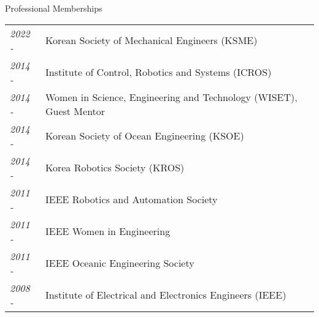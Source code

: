 \begin{rSection}{Professional Memberships}
    \begin{tabular}{ @{} >{\itshape}l @{\hspace{6ex}} l }
    2022 -      & Korean Society of Mechanical Engineers (KSME)\\  
    2014 -      & Institute of Control, Robotics and Systems (ICROS)\\
    2014 -      & Women in Science, Engineering and Technology (WISET), Guest Mentor\\
    2014 -      & Korean Society of Ocean Engineering (KSOE)\\
    2014 -      & Korea Robotics Society (KROS)\\
    2011 -      & IEEE Robotics and Automation Society \\
    2011 -      & IEEE Women in Engineering\\
    2011 -      & IEEE Oceanic Engineering Society \\
    2008 - \hspace{8mm}  & Institute of Electrical and Electronics Engineers (IEEE) \\
    \end{tabular}
\end{rSection}
